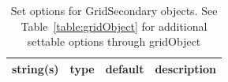 \begin{table}[ht]
\centering
\begin{tabular}{p{5cm} c c p{7cm}}
\hline
string(s) & type & default & description \\
\hline
\hline
\end{tabular}
\caption{Set options for GridSecondary objects. See Table~\ref{table:gridObject} for additional settable options through gridObject}
\label{table:gridSecondary}
\end{table}
